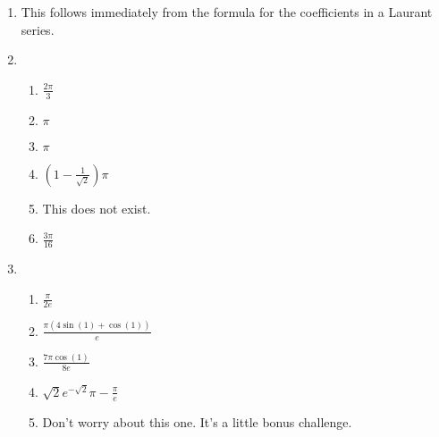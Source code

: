 \begin{enumerate}
	\item This follows immediately from the formula for the coefficients in a Laurant series.
	
	\item 
	\begin{enumerate}
		\item $\frac{2\pi}{3}$
		\item $\pi$
		\item $\pi$
		\item $\left(1- \frac{1}{\sqrt{2}}\right)\pi$
		\item This does not exist.
		\item $\frac{3\pi}{16}$
	
	\end{enumerate}
	
	
	\item 
	\begin{enumerate}
		\item $\frac{\pi}{2e}$
		\item $\frac{\pi(4\sin(1) + \cos(1))}{e}$
		\item $\frac{7\pi\cos(1)}{8e}$
		\item $\sqrt{2}e^{-\sqrt{2}}\pi - \frac{\pi}{e}$
		\item Don't worry about this one. It's a little bonus challenge.
	
	\end{enumerate}
\end{enumerate}


